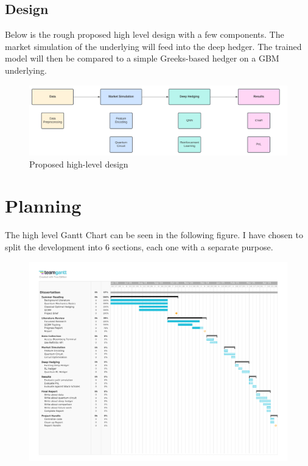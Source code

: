 \documentclass[12pt]{article}
\numberwithin{equation}{section}
\begin{document}
\subsection{Design}
Below is the rough proposed high level design with a few components. The market 
simulation of the underlying will feed into the deep hedger. The trained model 
will then be compared to a simple Greeks-based hedger on a GBM underlying.
\begin{figure}[h]
    \centering
    \includegraphics[scale=0.65,width=\textwidth]{pipeline.png}
    \caption{Proposed high-level design}
\end{figure}

\clearpage 
\section{Planning}
The high level Gantt Chart can be seen in the following figure. I have chosen 
to split the development into 6 sections, each one with a separate purpose.
\begin{figure}[htp]
\includegraphics[page=1,width=\textwidth,scale=1.4]{GanttChart.pdf}
\end{figure}
\end{document}
